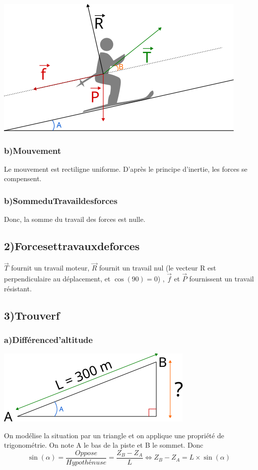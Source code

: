 \documentclass[a4paper,twoside,10pt,french]{scrartcl}
\begin{document}
\includegraphics{fig28-1}
\subsubsection{b)\:Mouvement}
Le mouvement est rectiligne uniforme. D’après le principe d’inertie, les forces se compensent.
\subsubsection{b)\:Somme\:du\:Travail\:des\:forces}
Donc, la somme du travail des forces est nulle.
\subsection{2)\:Forces\:et\:travaux\:de\:forces}
$\overrightarrow{T}$ fournit un travail moteur, $\overrightarrow{R}$ fournit un travail nul (le vecteur R est perpendiculaire au déplacement, et $\cos (90) = 0$) , $\overrightarrow{f}$ et $\overrightarrow{P}$ fournissent un travail résistant.
\subsection{3)\:Trouver\:f}
\subsubsection{a)Différence\:d'altitude}

\includegraphics{fig28-2}

On modélise la situation par un triangle et on applique une propriété de trigonométrie. On note A le bas de la piste et B le sommet. Donc $$\sin(\alpha) = \frac{Oppose}{Hypothénuse} = \frac{Z_B - Z_A}{L} \Leftrightarrow Z_B - Z_A = L \times \sin(\alpha)$$
\end{document}
